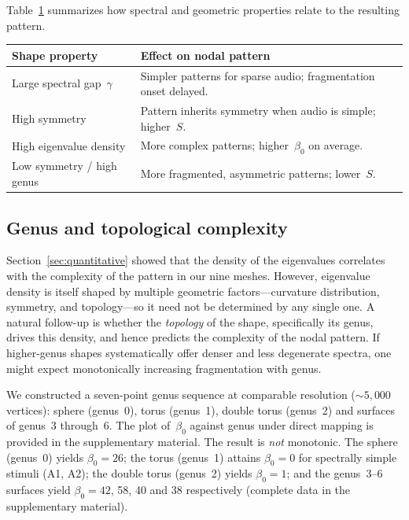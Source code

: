 \documentclass[]{interact}
\theoremstyle{plain}
\theoremstyle{definition}
\theoremstyle{remark}
\begin{document}
Table~\ref{tab:shapefilter} summarizes how spectral and geometric properties relate to the resulting pattern.

\begin{table}[t]
{\begin{tabular}{@{}ll@{}} \toprule
Shape property & Effect on nodal pattern \\ \midrule
Large spectral gap~$\gamma$
  & Simpler patterns for sparse audio; fragmentation onset delayed. \\
High symmetry
  & Pattern inherits symmetry when audio is simple; higher~$S$. \\
High eigenvalue density
  & More complex patterns; higher~$\beta_0$ on average. \\
Low symmetry / high genus
  & More fragmented, asymmetric patterns; lower~$S$. \\
\bottomrule
\end{tabular}}
\label{tab:shapefilter}
\end{table}

\subsection{Genus and topological complexity}
\label{sec:genus}

Section~\ref{sec:quantitative} showed that the density of the eigenvalues correlates with the complexity of the pattern in our nine meshes. However, eigenvalue density is itself shaped by multiple geometric factors---curvature distribution, symmetry, and topology---so it need not be determined by any single one. A natural follow-up is whether the \emph{topology} of the shape, specifically its genus, drives this density, and hence predicts the complexity of the nodal pattern. If higher-genus shapes systematically offer denser and less degenerate spectra, one might expect monotonically increasing fragmentation with genus.

We constructed a seven-point genus sequence at comparable resolution (${\sim}5{,}000$ vertices): sphere (genus~0), torus (genus~1), double torus (genus~2) and surfaces of genus~3 through~6. The plot of~$\beta_0$ against genus under direct mapping is provided in the supplementary material. The result is \emph{not} monotonic. The sphere (genus~0) yields $\beta_0=26$; the torus (genus~1) attains $\beta_0=0$ for spectrally simple stimuli (A1, A2); the double torus (genus~2) yields $\beta_0=1$; and the genus~3--6 surfaces yield $\beta_0 = 42$, 58, 40 and 38 respectively (complete data in the supplementary material).
\end{document}
